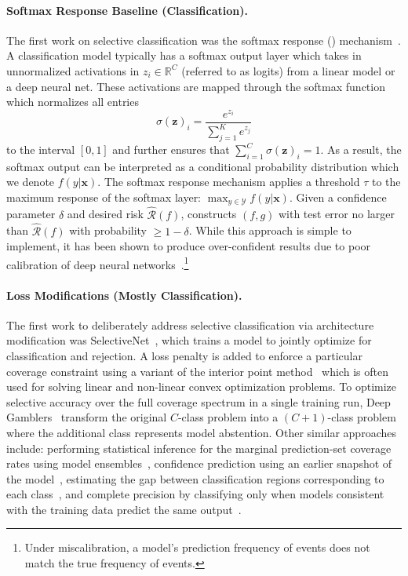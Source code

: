\paragraph{Softmax Response Baseline (Classification).} The first work on selective classification was the softmax response (\sr) mechanism~\citep{hendrycks2016baseline, geifman2017selective}. A classification model typically has a softmax output layer which takes in unnormalized activations in $z_{i} \in \mathbb{R}^C$ (referred to as logits) from a linear model or a deep neural net. These activations are mapped through the softmax function which normalizes all entries 
\begin{equation}
    \sigma(\bm{z})_{i}=\frac{e^{z_{i}}}{\sum_{j=1}^{K} e^{z_{j}}}
\end{equation}
to the interval $[0,1]$ and further ensures that $\sum_{i=1}^{C} \sigma(\bm{z})_{i} = 1$. As a result, the softmax output can be interpreted as a conditional probability distribution which we denote $f(y|\bm{x})$.
The softmax response mechanism applies a threshold $\tau$ to the maximum response of the softmax layer: $\max_{y \in \mathcal{Y}}f(y|\bm{x})$. 
Given a confidence parameter $\delta$ and desired risk $\hat{\mathcal{R}}(f)$, \sr constructs $(f, g)$ with test error no larger than $\hat{\mathcal{R}}(f)$ with probability $\geq 1-\delta$. 
While this approach is simple to implement, it has been shown to produce over-confident results due to poor calibration of deep neural networks~\citep{guo2017calibration}.\footnote{Under miscalibration, a model's prediction frequency of events does not match the true frequency of events.} 

\paragraph{Loss Modifications (Mostly Classification).} 
The first work to deliberately address selective classification via architecture modification was SelectiveNet~\citep{geifman2019selectivenet}, which trains a model to jointly optimize for classification and rejection. A loss penalty is added to enforce a particular coverage constraint using a variant of the interior point method~\cite{potra2000interior} which is often used for solving linear and non-linear convex optimization problems. To optimize selective accuracy over the full coverage spectrum in a single training run, Deep Gamblers~\citep{liu2019deep} transform the original $C$-class problem into a $(C + 1)$-class problem where the additional class represents model abstention.  Other similar approaches include: performing statistical inference for the marginal prediction-set coverage rates using model ensembles~\citep{feng2021selective}, confidence prediction using an earlier snapshot of the model~\citep{geifman2018bias}, estimating the gap between classification regions corresponding to each class~\citep{gangrade2021selective}, and complete precision by classifying only when models consistent with the training data predict the same output~\citep{khani2016unanimous}. 

